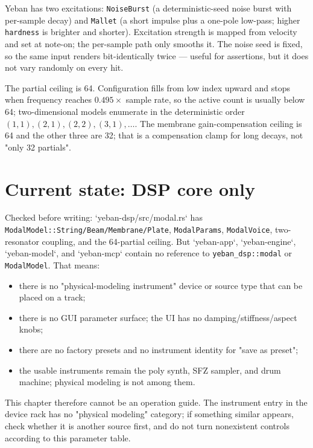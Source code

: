 Yeban has two excitations: \texttt{NoiseBurst} (a deterministic-seed noise burst with per-sample decay) and \texttt{Mallet} (a short impulse plus a one-pole low-pass; higher \texttt{hardness} is brighter and shorter). Excitation strength is mapped from velocity and set at note-on; the per-sample path only smooths it. The noise seed is fixed, so the same input renders bit-identically twice — useful for assertions, but it does not vary randomly on every hit.

The partial ceiling is 64. Configuration fills from low index upward and stops when frequency reaches $0.495\times$ sample rate, so the active count is usually below 64; two-dimensional models enumerate in the deterministic order $(1,1),(2,1),(2,2),(3,1),\dots$. The membrane gain-compensation ceiling is 64 and the other three are 32; that is a compensation clamp for long decays, not "only 32 partials".

\section{Current state: DSP core only}

Checked before writing: `yeban-dsp/src/modal.rs` has \texttt{ModalModel::String/\allowbreak Beam/\allowbreak Membrane/\allowbreak Plate}, \texttt{ModalParams}, \texttt{ModalVoice}, two-resonator coupling, and the 64-partial ceiling. But `yeban-app`, `yeban-engine`, `yeban-model`, and `yeban-mcp` contain no reference to \texttt{yeban\_dsp::modal} or \texttt{ModalModel}. That means:

\begin{itemize}
  \item there is no "physical-modeling instrument" device or source type that can be placed on a track;
  \item there is no GUI parameter surface; the UI has no damping/stiffness/aspect knobs;
  \item there are no factory presets and no instrument identity for "save as preset";
  \item the usable instruments remain the poly synth, SFZ sampler, and drum machine; physical modeling is not among them.
\end{itemize}

This chapter therefore cannot be an operation guide. The instrument entry in the device rack has no "physical modeling" category; if something similar appears, check whether it is another source first, and do not turn nonexistent controls according to this parameter table.

